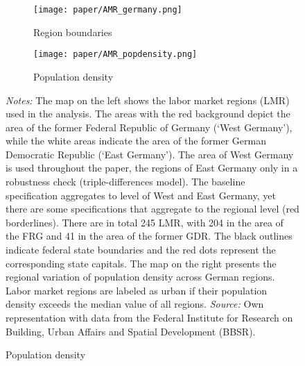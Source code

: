 \begin{landscape}
	\vspace*{\fill}
	\begin{figure}[H]\centering
		\caption{Labor market regions in Germany}\label{fig_mlch: AMR_regions_Germany}
		\begin{subfigure}[h]{0.43\linewidth}\centering\caption{Region boundaries}
			\texttt{[image: paper/AMR\_germany.png]}
		\end{subfigure}
		\begin{subfigure}[h]{0.55\linewidth}\centering\caption{Population density}
			\texttt{[image: paper/AMR\_popdensity.png]}
		\end{subfigure}
		\scriptsize
		\begin{minipage}{0.95\linewidth}
			\emph{Notes:} The map on the left shows the labor market regions (LMR) used in the analysis. The areas with the red background depict the area of the former Federal Republic of Germany (`West Germany'), while the white areas indicate the area of the former German Democratic Republic (`East Germany'). The area of West Germany is used throughout the paper, the regions of East Germany only in a robustness check (triple-differences model). The baseline specification aggregates to level of West and East Germany, yet there are some specifications that aggregate to the regional level (red borderlines). There are in total 245 LMR, with 204 in the area of the FRG and 41 in the area of the former GDR. The black outlines indicate federal state boundaries and the red dots represent the corresponding state capitals. The map on the right presents the regional variation of population density across German regions. Labor market regions are labeled as urban if their population density exceeds the median value of all regions.
			\newline \emph{Source:} Own representation with data from the Federal Institute for Research on Building, Urban Affairs and Spatial Development (BBSR).
		\end{minipage}
	\end{figure}
	\vspace*{\fill}\clearpage
\end{landscape}
\restoregeometry 




